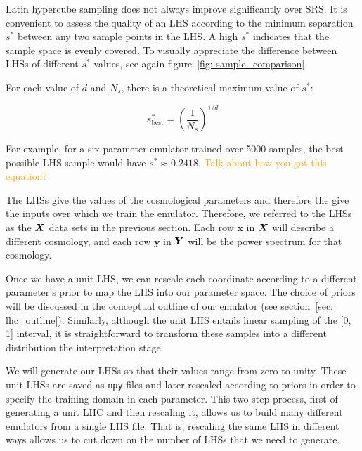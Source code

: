 Latin hypercube sampling does not always improve significantly over SRS. It is 
convenient to
assess the quality of an LHS according to the minimum separation $s^*$ 
between any two sample points in the LHS. A high $s^*$ indicates that 
the sample space is evenly covered. To visually appreciate the difference 
between LHSs of different $s^*$ values, see again
figure~\ref{fig: sample_comparison}.

For each value of $d$ and $N_s$, there is a theoretical maximum value of
$s^*$:

\begin{equation}
\label{eq: best_lhs_sep}
s^*_\text{best} = \left( \frac{1}{N_s} \right)^{1 / d}
\end{equation}

For example, for a six-parameter emulator trained over 5000 samples, the best
possible LHS sample would have $s^* \approx 0.2418$.
\textcolor{orange}{Talk about how you got this equation?}

The LHSs give the values of the cosmological parameters and therefore
the give the inputs over which we train the emulator.
Therefore, we referred to the LHSs as the
$\bm{X}$ data sets in the previous section. Each
row $\bm{x}$ in $\bm{X}$ will describe a different cosmology, and each
row $\bm{y}$ in $\bm{Y}$ will be the power spectrum for that cosmology.

Once we have a unit LHS, we can rescale each coordinate according to a 
different parameter's prior to map the LHS into our parameter space. The
choice of priors will be discussed in the conceptual outline of our
emulator (see section~\ref{sec: lhc_outline}). Similarly,
although the unit LHS entails linear sampling of the [0, 1] interval, it is 
straightforward to transform these samples into a different distribution
the interpretation stage.



We will generate our LHSs so that their values range from zero to unity.
These unit LHSs are saved as
\texttt{npy} files and later rescaled according to priors in order to
specify the training
domain in each parameter. This two-step process, first of generating a unit
LHC and then rescaling it, allows us to build many different emulators from a 
single LHS file. That is, rescaling the same LHS in different ways allows us
to cut down on the number of LHSs that we need to generate.


